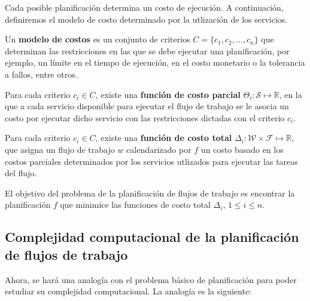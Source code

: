 Cada posible planificación determina un costo de ejecución. A continuación, definiremos el modelo de costo determinado por la utlización de los servicios.

\begin{defn}
Un \textbf{modelo de costos} es un conjunto de criterios $C = \{c_1, c_2, \dots, c_n\}$ que determinan las restricciones en las que se debe ejecutar una planificación, por ejemplo, un límite en el tiempo de ejecución, en el costo monetario o la tolerancia a fallos, entre otros.
\end{defn}

\begin{defn}
Para cada criterio $c_i \in C$, existe una \textbf{función de costo parcial} $\Theta_i : \mathcal{S} \mapsto \mathbb{R}$, en la que a cada servicio disponible para ejecutar el flujo de trabajo se le asocia un costo por ejecutar dicho servicio con las restricciones dictadas con el criterio $c_i$.
\end{defn}

\begin{defn}
Para cada criterio $c_i \in C$, existe una \textbf{función de costo total} $\Delta_i : \mathcal{W} \times \mathcal{F} \mapsto \mathbb{R}$, que asigna un flujo de trabajo $w$ calendarizado por $f$ un costo basado en los costos parciales determinados por los servicios utlizados para ejecutar las tareas del flujo.
\end{defn}

El objetivo del problema de la planificación de flujos de trabajo es encontrar la planificación $f$ que minimice las funciones de costo total $\Delta_i$, $1 \le i \le n$.

\subsection{Complejidad computacional de la planificación de flujos de trabajo}
Ahora, se hará una analogía con el problema básico de planificación para poder estudiar su complejidad computacional. La analogía es la siguiente:



